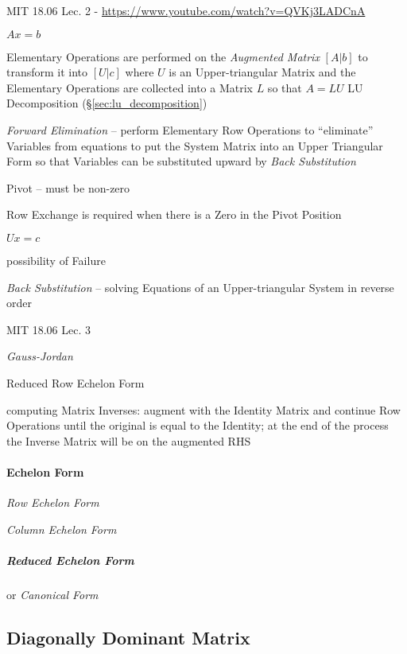 MIT 18.06 Lec. 2 - \url{https://www.youtube.com/watch?v=QVKj3LADCnA}

$Ax = b$

Elementary Operations are performed on the \emph{Augmented Matrix} $[A | b]$ to
transform it into $[U | c]$ where $U$ is an Upper-triangular Matrix and the
Elementary Operations are collected into a Matrix $L$ so that $A = LU$ \fist LU
Decomposition (\S\ref{sec:lu_decomposition})

\emph{Forward Elimination} -- perform Elementary Row Operations to
``eliminate'' Variables from equations to put the System Matrix into an Upper
Triangular Form so that Variables can be substituted upward by \emph{Back
  Substitution}

Pivot -- must be non-zero

Row Exchange is required when there is a Zero in the Pivot Position

$Ux = c$

possibility of Failure

\emph{Back Substitution} -- solving Equations of an Upper-triangular System in
reverse order


MIT 18.06 Lec. 3

\emph{Gauss-Jordan}

Reduced Row Echelon Form

computing Matrix Inverses: augment with the Identity Matrix and continue Row
Operations until the original is equal to the Identity; at the end of the
process the Inverse Matrix will be on the augmented RHS



\paragraph{Echelon Form}\label{sec:echelon_form}\hfill

\emph{Row Echelon Form}

\emph{Column Echelon Form}



\subparagraph{Reduced Echelon Form}\label{sec:reduced_echelon}\hfill

or \emph{Canonical Form}



\subsection{Diagonally Dominant Matrix}\label{sec:diagonally_dominant}

